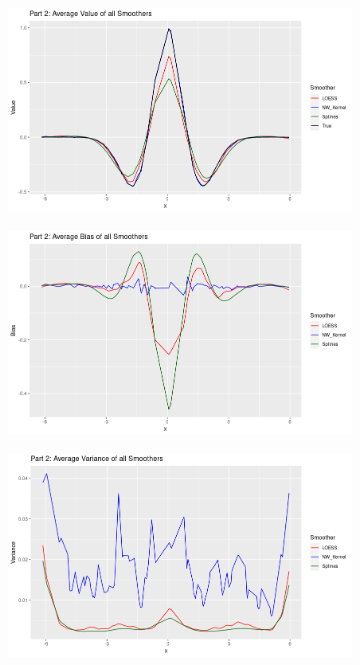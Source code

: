\documentclass[12pt,letterpaper]{article}
\begin{document}
\begin{figure}[!htp]
    \caption{Results from Part 2, deterministic point set}
    \centering
    \begin{subfigure}{0.45\textwidth}
      \includegraphics[width=\textwidth]{p2_value}
    \end{subfigure}
    \begin{subfigure}{0.45\textwidth}
      \includegraphics[width=\textwidth]{p2_bias}
    \end{subfigure}
    \begin{subfigure}{0.45\textwidth}
      \includegraphics[width=\textwidth]{p2_var}

\end{subfigure}
\end{figure}
\end{document}
